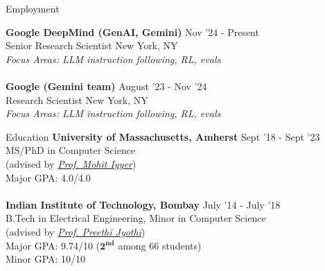 \documentclass{resume} %
\begin{document}

\begin{rSection}{Employment}
\vspace*{0.1in}

{\bf Google DeepMind (GenAI, Gemini)} { \hfill Nov '24 - Present}\\ Senior Research Scientist {\hfill New York, NY}\\
\emph{Focus Areas: LLM instruction following, RL, evals} \\\\
{\bf Google (Gemini team)} { \hfill August '23 - Nov '24}\\ Research Scientist {\hfill New York, NY}\\
\emph{Focus Areas: LLM instruction following, RL, evals} 


\end{rSection}

\begin{rSection}{Education}
\vspace*{0.1in}
{\bf University of Massachusetts, Amherst} \hfill {Sept '18 - Sept '23} \\ MS/PhD in Computer Science \\ (advised by \textit{\href{https://people.cs.umass.edu/~miyyer/}{Prof. Mohit Iyyer}}) \\
Major GPA: 4.0/4.0\\\\
{\bf Indian Institute of Technology, Bombay} \hfill {July '14 - July '18} \\ 
B.Tech in Electrical Engineering, Minor in Computer Science\\
(advised by \textit{\href{https://www.cse.iitb.ac.in/~pjyothi/}{Prof. Preethi Jyothi}})\\
Major GPA: 9.74/10 ($\mathbf{2^{nd}}$ among 66 students)\\
Minor GPA: 10/10
\end{rSection}
\end{document}

